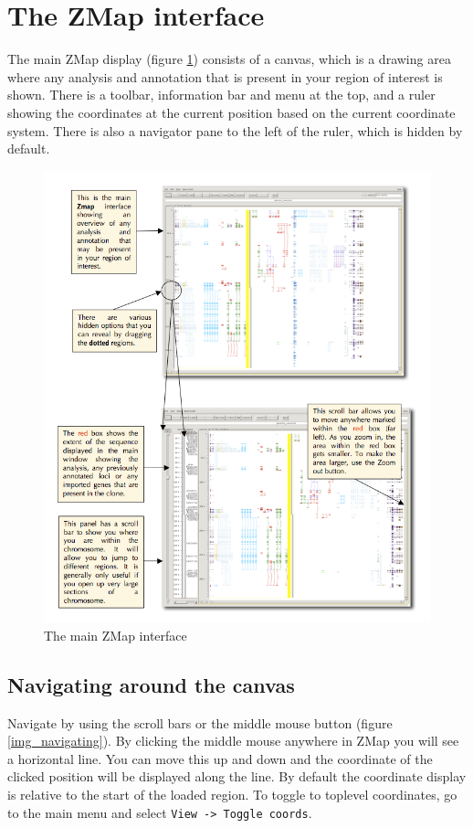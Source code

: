 \documentclass[letterpaper]{article}
\begin{document}
\clearpage
\section{The ZMap interface}

The main ZMap display (figure \ref{img_main_interface}) consists of a canvas, which is a drawing area where any analysis and annotation that is present in your region of interest is shown. There is a toolbar, information bar and menu at the top, and a ruler showing the coordinates at the current position based on the current coordinate system. There is also a navigator pane to the left of the ruler, which is hidden by default.

\begin{figure}
\centering
\color[rgb]{0.30980393,0.5058824,0.7411765}
\includegraphics[width=15.231cm]{images/main_interface.png}
\caption{The main ZMap interface}
\label{img_main_interface}
\end{figure}


\subsection{Navigating around the canvas}
Navigate by using the scroll bars or the middle mouse button (figure \ref{img_navigating}). By clicking the middle mouse anywhere in ZMap you will see a horizontal line. You can move this up and down and the coordinate of the clicked position will be displayed along the line. By default the coordinate display is relative to the start of the loaded region. To toggle to toplevel coordinates, go to the main menu and select \lstinline{View -> Toggle coords}.
\end{document}
